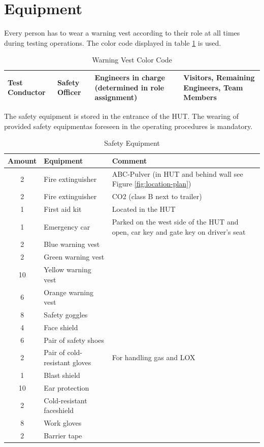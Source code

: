 \documentclass{article}
\begin{document}
\section{Equipment}
Every person has to wear a warning vest according to their role at all times during testing operations. The color code displayed in table \ref{tab:color-code} is used.
\begin{table}[h]
    \caption{Warning Vest Color Code}
    \label{tab:color-code}
    \begin{tabularx}{0.9\textwidth}{|X|X|X|X|}
        \hline
        \cellcolor{cyan} Test Conductor & \cellcolor{green} Safety Officer & \cellcolor{orange} Engineers in charge (determined in role assignment) & \cellcolor{yellow} Visitors, Remaining Engineers, Team Members \\ \hline
    \end{tabularx}
\end{table}
The safety equipment is stored in the entrance of the HUT. The wearing of provided safety equipmentas foreseen in the operating procedures is mandatory.
\begin{table}[h]
    \caption{Safety Equipment}
    \label{tab:safety-equipment}
    \begin{tabularx}{0.9\textwidth}{|c|X|X|}
        \hline
        \rowcolor{tableHeaderColor} \textbf{Amount} & \textbf{Equipment} & \textbf{Comment} \\ \hline
        2 & Fire extinguisher & ABC-Pulver (in HUT and behind wall see Figure \ref{fig:location-plan}) \\ \hline
        2 & Fire extinguisher & CO2 (class B next to trailer) \\ \hline
        1 & First aid kit & Located in the HUT \\ \hline
        1 & Emergency car & Parked on the west side of the HUT and open, car key and gate key on driver's seat \\ \hline
        2 & Blue warning vest & \\ \hline
        2 & Green warning vest & \\ \hline
        10 & Yellow warning vest & \\ \hline
        6 & Orange warning vest & \\ \hline
        8 & Safety goggles & \\ \hline
        4 & Face shield & \\ \hline
        6 & Pair of safety shoes & \\ \hline
        2 & Pair of cold-resistant gloves & For handling gas and LOX \\ \hline
        1 & Blast shield & \\ \hline
        10 & Ear protection & \\ \hline
        2 & Cold-resistant faceshield & \\ \hline
        8 & Work gloves & \\ \hline
        2 & Barrier tape & \\ \hline
    \end{tabularx}
\end{table}
\newpage
\end{document}
